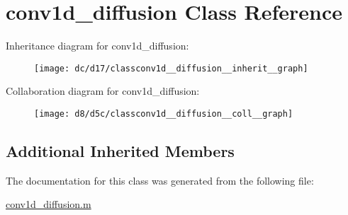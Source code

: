 \hypertarget{classconv1d__diffusion}{}\section{conv1d\+\_\+diffusion Class Reference}
\label{classconv1d__diffusion}


Inheritance diagram for conv1d\+\_\+diffusion\+:
\nopagebreak
\begin{figure}[H]
\begin{center}
\leavevmode
\texttt{[image: dc/d17/classconv1d\_\_diffusion\_\_inherit\_\_graph]}
\end{center}
\end{figure}


Collaboration diagram for conv1d\+\_\+diffusion\+:
\nopagebreak
\begin{figure}[H]
\begin{center}
\leavevmode
\texttt{[image: d8/d5c/classconv1d\_\_diffusion\_\_coll\_\_graph]}
\end{center}
\end{figure}
\subsection*{Additional Inherited Members}


The documentation for this class was generated from the following file\+:\begin{DoxyCompactItemize}
\item 
\hyperlink{conv1d__diffusion_8m}{conv1d\+\_\+diffusion.\+m}\end{DoxyCompactItemize}
